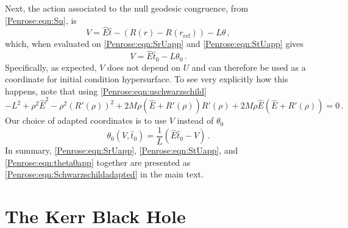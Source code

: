 Next, the action associated to the null geodesic congruence, from \eqref{Penrose:eqn:Su}, is
\begin{equation}
V = \hat{E} \hat{t} - (R(r)-R(r_{\mathrm{ref}})) - L \theta \, ,
\end{equation}
which, when evaluated on \eqref{Penrose:eqn:SrUapp} and \eqref{Penrose:eqn:StUapp} gives
\begin{equation}
V = \hat{E} \hat{t}_0 - L \theta_0 \, .
\end{equation}
Specifically, as expected, $V$ does not depend on $U$ and can therefore be used as a coordinate for initial condition hypersurface. To see very explicitly how this happens, note that  using \eqref{Penrose:eqn:uschwarzschild} 
\begin{equation}
-L^2  +\rho^2 \hat{E}^2-\rho^2 (R'(\rho))^2 +2M \rho \left(\hat{E}+R'(\rho)\right)R'(\rho) +2M \rho \hat{E} \left(\hat{E}+ R'(\rho)\right) = 0 \, .
\end{equation}
Our choice of adapted coordinates is to use $V$ instead of $\theta_0$
\begin{equation}\label{Penrose:eqn:theta0app}
\theta_0(V,\hat{t}_0) = \frac{1}{L}\left(\hat{E}\hat{t}_0  - V\right) \, .
\end{equation}
In summary, \eqref{Penrose:eqn:SrUapp}, \eqref{Penrose:eqn:StUapp}, and  \eqref{Penrose:eqn:theta0app} together are presented as \eqref{Penrose:eqn:Schwarzschildadapted} in the main text. 

\section{The Kerr Black Hole}\label{Penrose:app:Kerr}

